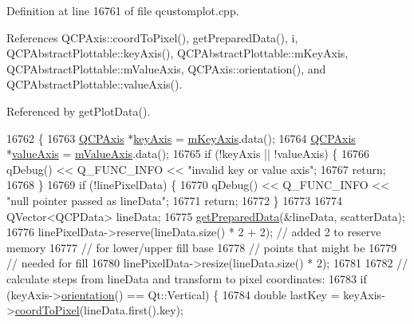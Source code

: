 Definition at line 16761 of file qcustomplot.\+cpp.



References Q\+C\+P\+Axis\+::coord\+To\+Pixel(), get\+Prepared\+Data(), i, Q\+C\+P\+Abstract\+Plottable\+::key\+Axis(), Q\+C\+P\+Abstract\+Plottable\+::m\+Key\+Axis, Q\+C\+P\+Abstract\+Plottable\+::m\+Value\+Axis, Q\+C\+P\+Axis\+::orientation(), and Q\+C\+P\+Abstract\+Plottable\+::value\+Axis().



Referenced by get\+Plot\+Data().


\begin{DoxyCode}
16762                                                                          \{
16763   \hyperlink{class_q_c_p_axis}{QCPAxis} *\hyperlink{class_q_c_p_abstract_plottable_a72c7a09c22963f2c943f07112b311103}{keyAxis} = \hyperlink{class_q_c_p_abstract_plottable_a426f42e254d0f8ce5436a868c61a6827}{mKeyAxis}.data();
16764   \hyperlink{class_q_c_p_axis}{QCPAxis} *\hyperlink{class_q_c_p_abstract_plottable_a3106f9d34d330a6097a8ec5905e5b519}{valueAxis} = \hyperlink{class_q_c_p_abstract_plottable_a2901452ca4aea911a1827717934a4bda}{mValueAxis}.data();
16765   \textcolor{keywordflow}{if} (!keyAxis || !valueAxis) \{
16766     qDebug() << Q\_FUNC\_INFO << \textcolor{stringliteral}{"invalid key or value axis"};
16767     \textcolor{keywordflow}{return};
16768   \}
16769   \textcolor{keywordflow}{if} (!linePixelData) \{
16770     qDebug() << Q\_FUNC\_INFO << \textcolor{stringliteral}{"null pointer passed as lineData"};
16771     \textcolor{keywordflow}{return};
16772   \}
16773 
16774   QVector<QCPData> lineData;
16775   \hyperlink{class_q_c_p_graph_ab420b46ba638dc3252439fe16687b244}{getPreparedData}(&lineData, scatterData);
16776   linePixelData->reserve(lineData.size() * 2 + 2); \textcolor{comment}{// added 2 to reserve memory}
16777                                                    \textcolor{comment}{// for lower/upper fill base}
16778                                                    \textcolor{comment}{// points that might be}
16779                                                    \textcolor{comment}{// needed for fill}
16780   linePixelData->resize(lineData.size() * 2);
16781 
16782   \textcolor{comment}{// calculate steps from lineData and transform to pixel coordinates:}
16783   \textcolor{keywordflow}{if} (keyAxis->\hyperlink{class_q_c_p_axis_a57483f2f60145ddc9e63f3af53959265}{orientation}() == Qt::Vertical) \{
16784     \textcolor{keywordtype}{double} lastKey = keyAxis->\hyperlink{class_q_c_p_axis_a985ae693b842fb0422b4390fe36d299a}{coordToPixel}(lineData.first().key);

\end{DoxyCode}
